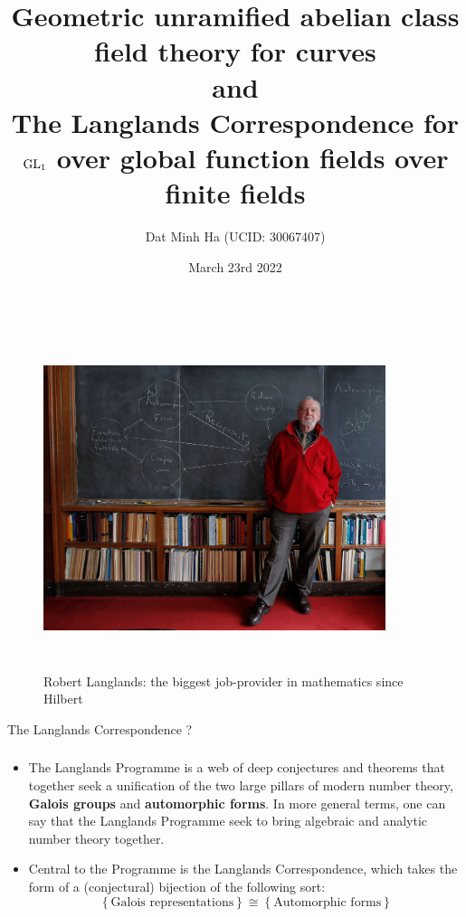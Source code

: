 \documentclass{beamer}
\title{Geometric unramified abelian class field theory for curves\\and\\The Langlands Correspondence for $\operatorname{GL}_1$ over global function fields over finite fields}
\author{Dat Minh Ha (UCID: 30067407)}
\institute{Department of Mathematics and Statistics\\University of Calgary}
\date{March 23rd 2022}
\begin{document}
    \frame{\titlepage}
    
    \begin{frame}
        \begin{figure}[H]
            \centering
            \includegraphics[width=10cm,height=10cm,keepaspectratio]{Proposal, timeline, and presentation/robert_langlands.jpg}
            \caption{Robert Langlands: the biggest job-provider in mathematics since Hilbert}
            \label{fig: robert_langlands}
        \end{figure}
    \end{frame}
    
    \begin{frame}{The Langlands Correspondence ?}
        \frametitle{}
        \begin{itemize}
            \item The Langlands Programme is a web of deep conjectures and theorems that together seek a unification of the two large pillars of modern number theory, \textbf{Galois groups} and \textbf{automorphic forms}. In more general terms, one can say that the Langlands Programme seek to bring algebraic and analytic number theory together.
            \item Central to the Programme is the Langlands Correspondence, which takes the form of a (conjectural) bijection of the following sort:    
                $$\left\{\text{Galois representations}\right\} \cong \left\{\text{Automorphic forms}\right\}$$
        \end{itemize}
    \end{frame}
    
\end{document}
